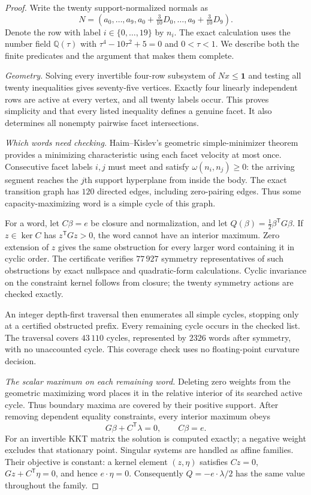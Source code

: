 \begin{proof}
Write the twenty support-normalized normals as
\[
 N=(a_0,\ldots,a_9,a_0+\tfrac3{10}D_0,\ldots,
                    a_9+\tfrac3{10}D_9).
\]
Denote the row with label $i\in\{0,\ldots,19\}$ by $n_i$.
The exact calculation uses the number field
$\mathbb Q(\tau)$ with $\tau^4-10\tau^2+5=0$ and $0<\tau<1$.
We describe both the finite predicates and the argument that makes them
complete.

\emph{Geometry.}
Solving every invertible four-row subsystem of $Nx\leq\mathbf1$ and testing
all twenty inequalities gives seventy-five vertices. Exactly four linearly
independent rows are active at every vertex, and all twenty labels occur.
This proves simplicity and that every listed inequality defines a genuine
facet. It also determines all nonempty pairwise facet intersections.

\emph{Which words need checking.}
Haim--Kislev's geometric simple-minimizer theorem~\cite[Theorem~1.5]{HK2017} provides a minimizing
characteristic using each facet velocity at most once. Consecutive facet
labels $i,j$ must meet and satisfy $\omega(n_i,n_j)\geq0$: the arriving
segment reaches the $j$th support hyperplane from inside the body.
The exact transition graph has $120$ directed edges, including zero-pairing
edges. Thus some capacity-maximizing word is a simple cycle of this graph.

For a word, let $C\beta=e$ be closure and normalization, and let
$Q(\beta)=\tfrac12\beta^{\mathsf T}G\beta$. If
$z\in\ker C$ has $z^{\mathsf T}Gz>0$, the word cannot have an interior
maximum. Zero extension of $z$ gives the same obstruction for every
larger word containing it in cyclic order. The certificate verifies
$77\,927$ symmetry representatives of such obstructions by exact nullspace
and quadratic-form calculations. Cyclic invariance on the constraint
kernel follows from closure; the twenty symmetry actions are checked exactly.

An integer depth-first traversal then enumerates all simple cycles, stopping
only at a certified obstructed prefix. Every remaining cycle occurs in the
checked list. The traversal covers $43\,110$ cycles, represented by $2326$
words after symmetry, with no unaccounted cycle. This coverage check uses no
floating-point curvature decision.

\emph{The scalar maximum on each remaining word.}
Deleting zero weights from the geometric maximizing word places it in the
relative interior of its searched active cycle. Thus boundary maxima are
covered by their positive support.
After removing dependent equality constraints, every interior maximum obeys
\[
 G\beta+C^{\mathsf T}\lambda=0,\qquad C\beta=e.
\]
For an invertible KKT matrix the solution is computed exactly; a negative
weight excludes that stationary point. Singular systems are handled as
affine families. Their objective is constant: a kernel element $(z,\eta)$
satisfies $Cz=0$, $Gz+C^{\mathsf T}\eta=0$, and hence $e\cdot\eta=0$.
Consequently $Q=-e\cdot\lambda/2$ has the same value throughout the family.


\end{proof}
